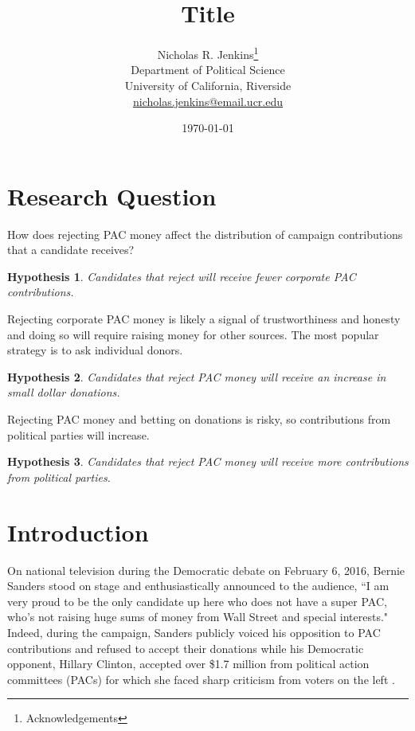 \documentclass[12pt]{article}
\title{\textbf{Title}}
\author{Nicholas R. Jenkins\thanks{Acknowledgements} \\ Department of Political Science\\ University of California, Riverside\\ \href{mailto:nicholas.jenkins@email.ucr.edu}{nicholas.jenkins@email.ucr.edu}}
\date{\today}
\newtheorem{hyp}{Hypothesis}
\begin{document}
\maketitle
\thispagestyle{empty}

\pagebreak

\cleardoublepage
\setcounter{page}{1}

\doublespacing

\section{Research Question}

How does rejecting PAC money affect the distribution of campaign contributions that a candidate receives?

\begin{hyp}
	Candidates that reject will receive fewer corporate PAC contributions.
\end{hyp}

Rejecting corporate PAC money is likely a signal of trustworthiness and honesty and doing so will require raising money for other sources. The most popular strategy is to ask individual donors.

\begin{hyp}
	Candidates that reject PAC money will receive an increase in small dollar donations. 
\end{hyp} 

Rejecting PAC money and betting on donations is risky, so contributions from political parties will increase.

\begin{hyp}
	Candidates that reject PAC money will receive more contributions from political parties.
\end{hyp}



\section{Introduction} \label{sec: intro}


On national television during the Democratic debate on February 6, 2016, Bernie Sanders stood on stage and enthusiastically announced to the audience, ``I am very proud to be the only candidate up here who does not have a super PAC, who’s not raising huge sums of money from Wall Street and special interests." Indeed, during the campaign, Sanders publicly voiced his opposition to PAC contributions and refused to accept their donations while his Democratic opponent, Hillary Clinton, accepted over \$1.7 million from political action committees (PACs) for which she faced sharp criticism from voters on the left \citep{harper_2020_2019, ye_hee_lee_sanderss_2016, seitz-wald_promise_2015, bump_why_2016}. 
\end{document}
